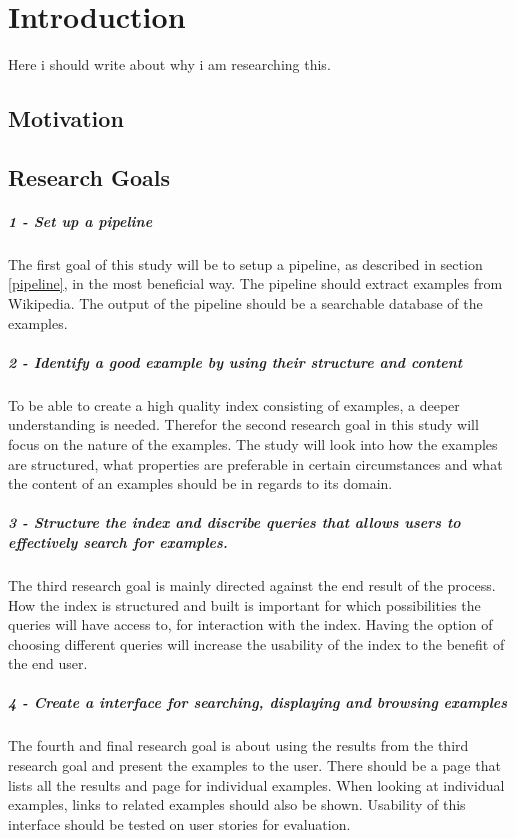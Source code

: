 
\chapter{Introduction}

Here i should write about why i am researching this.

\section{Motivation}

\section{Research Goals}

\paragraph{1 - Set up a pipeline}
The first goal of this study will be to setup a pipeline, as described in section \ref{pipeline}, in the most beneficial way. The pipeline should extract examples from Wikipedia. The output of the pipeline should be a searchable database of the examples.

\paragraph{2 - Identify a good example by using their structure and content}
To be able to create a high quality index consisting of examples, a deeper understanding is needed. Therefor the second research goal in this study will focus on the nature of the examples. The study will look into how the examples are structured, what properties are preferable in certain circumstances and what the content of an examples should be in regards to its domain. 

\paragraph{3 - Structure the index and discribe queries that allows users to effectively search for examples.}
The third research goal is mainly directed against the end result of the process. How the index is structured and built is important for which possibilities the queries will have access to, for interaction with the index. Having the option of choosing different queries will increase the usability of the index to the benefit of the end user. 

\paragraph{4 - Create a interface for searching, displaying and browsing examples}
The fourth and final research goal is about using the results from the third research goal and present the examples to the user. There should be a page that lists all the results and page for individual examples. When looking at individual examples, links to related examples should also be shown. Usability of this interface should be tested on user stories for evaluation.


\cleardoublepage